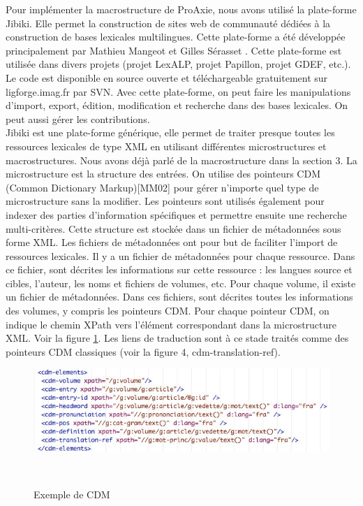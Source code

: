 \documentclass[10pt,a4paper,twoside]{article}
\begin{document}
\cite{MMCE11}
Pour implémenter la macrostructure de ProAxie, nous avons utilisé la plate-forme Jibiki. Elle permet la construction de sites web de communauté dédiées à la construction de bases lexicales multilingues. Cette plate-forme a été développée principalement par Mathieu Mangeot et Gilles Sérasset \cite{MM06}. Cette plate-forme est utilisée dans divers projets (projet LexALP, projet Papillon, projet GDEF, etc.). Le code est disponible en source ouverte et téléchargeable gratuitement sur ligforge.imag.fr par SVN. Avec cette plate-forme, on peut faire les manipulations d'import, export, édition, modification et recherche dans des bases lexicales. On peut aussi gérer les contributions. \\
Jibiki est une plate-forme générique, elle permet de traiter presque toutes les ressources lexicales de type XML en utilisant différentes microstructures et macrostructures. Nous avons déjà parlé de la macrostructure dans la section 3. La microstructure est la structure des entrées. On utilise des pointeurs CDM (Common Dictionary Markup)[MM02] pour gérer n'importe quel type de microstructure sans la modifier. Les pointeurs sont utilisés également pour indexer des parties d'information spécifiques et permettre ensuite une recherche multi-critères. Cette structure est stockée dans un fichier de métadonnées sous forme XML. Les fichiers de métadonnées ont pour but de faciliter l'import de ressources lexicales.  Il y a un fichier de métadonnées pour chaque ressource.  Dans ce fichier, sont décrites les informations sur cette ressource :  les langues source et cibles, l'auteur, les noms et fichiers de volumes, etc. Pour chaque volume, il existe un fichier de métadonnées. Dans ces fichiers, sont décrites toutes les informations des volumes, y compris les pointeurs CDM. Pour chaque pointeur CDM, on indique le chemin XPath vers l'élément correspondant dans la microstructure XML. Voir la figure \ref{image-CDM}. Les liens de traduction sont à ce stade traités comme des pointeurs CDM classiques (voir la figure 4, cdm-translation-ref). \\
\begin{figure}[htbp] 
\begin{center} 
\includegraphics[width=14cm]{images/CDM.jpg}
\end{center} 
\caption{Exemple de CDM} \label{image-CDM} \
\end{figure}
\end{document}
